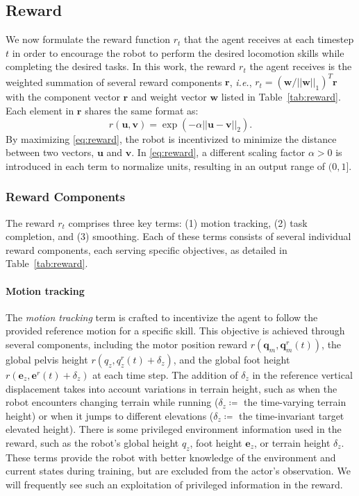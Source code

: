 \subsection{Reward}\label{subsec:reward}
We now formulate the reward function $r_t$ that the agent receives at each timestep $t$ in order to encourage the robot to perform the desired locomotion skills while completing the desired tasks. 
In this work, the reward $r_t$ the agent receives is the weighted summation of several reward components $\mathbf{r}$, \textit{i.e.}, $r_t = (\mathbf{w}/||\mathbf{w}||_1)^T \mathbf{r}$ with the component vector $\mathbf{r}$ and weight vector $\mathbf{w}$ listed in Table~\ref{tab:reward}.
Each element in $\mathbf{r}$ shares the same format as:
\begin{equation}\label{eq:reward}
    r(\mathbf{u},\mathbf{v}) = \exp({-\alpha||\mathbf{u}-\mathbf{v}||_2}).
\end{equation}\noindent 
By maximizing \eqref{eq:reward}, the robot is incentivized to minimize the distance between two vectors, $\mathbf{u}$ and $\mathbf{v}$. 
In \eqref{eq:reward}, a different scaling factor $\alpha>0$ is introduced in each term to normalize units, resulting in an output range of $(0,1]$.

\subsubsection{Reward Components}
The reward $r_t$ comprises three key terms: (1) motion tracking, (2) task completion, and (3) smoothing. 
Each of these terms consists of several individual reward components, each serving specific objectives, as detailed in Table~\ref{tab:reward}. 

\paragraph{Motion tracking}
The \textit{motion tracking} term is crafted to incentivize the agent to follow the provided reference motion for a specific skill.
This objective is achieved through several components, including the motor position reward $r(\mathbf{q}_m, \mathbf{q}_m^r(t))$, the global pelvis height $r(q_z, q^r_z(t)+\delta_z)$, and the global foot height $r(\mathbf{e}_z, \mathbf{e}^r(t)+\delta_z)$ at each time step.
The addition of $\delta_z$ in the reference vertical displacement takes into account variations in terrain height, such as when the robot encounters changing terrain while running ($\delta_z\coloneqq$ the time-varying terrain height) or when it jumps to different elevations ($\delta_z\coloneqq$ the time-invariant target elevated height). 
There is some privileged environment information used in the reward, such as the robot's global height $q_z$, foot height $\mathbf{e}_z$, or terrain height $\delta_z$. 
These terms provide the robot with better knowledge of the environment and current states during training, but are excluded from the actor's observation. We will frequently see such an exploitation of privileged information in the reward. 

